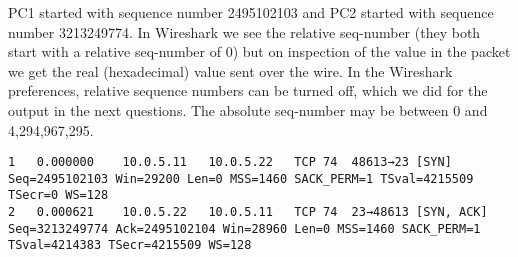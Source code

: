 PC1 started with sequence number 2495102103 and PC2 started with sequence number 3213249774. In Wireshark we see the relative seq-number (they both start with a relative seq-number of 0) but on inspection of the value in the packet we get the real (hexadecimal) value sent over the wire. In the Wireshark preferences, relative sequence numbers can be turned off, which we did for the output in the next questions. The absolute seq-number may be between 0 and 4,294,967,295.

\begin{lstlisting}
1	0.000000	10.0.5.11	10.0.5.22	TCP	74	48613→23 [SYN] Seq=2495102103 Win=29200 Len=0 MSS=1460 SACK_PERM=1 TSval=4215509 TSecr=0 WS=128
2	0.000621	10.0.5.22	10.0.5.11	TCP	74	23→48613 [SYN, ACK] Seq=3213249774 Ack=2495102104 Win=28960 Len=0 MSS=1460 SACK_PERM=1 TSval=4214383 TSecr=4215509 WS=128
\end{lstlisting}

